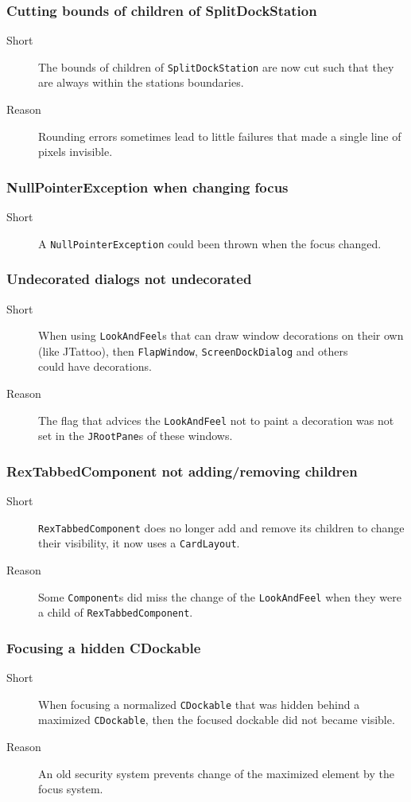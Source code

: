 \documentclass[a4paper,10pt]{article}
\newcommand{\src}[1]{\lstinline[basicstyle=\normalsize\ttfamily,keywordstyle=\normalsize\ttfamily,identifierstyle=\normalsize\ttfamily]|#1|}
\newcommand{\short}{\item[Short]}
\newcommand{\why}{\item[Reason]}
\begin{document}
\subsubsection{Cutting bounds of children of SplitDockStation}
\begin{description}
 \short The bounds of children of \src{SplitDockStation} are now cut such that they are always within the stations boundaries.
 \why Rounding errors sometimes lead to little failures that made a single line of pixels invisible.
\end{description}

\subsubsection{NullPointerException when changing focus}
\begin{description}
 \short A \src{NullPointerException} could been thrown when the focus changed.
\end{description}

\subsubsection{Undecorated dialogs not undecorated}
\begin{description}
 \short When using \src{LookAndFeel}s that can draw window decorations on their own (like JTattoo), then \src{FlapWindow}, \src{ScreenDockDialog} and others\\could have decorations.
 \why The flag that advices the \src{LookAndFeel} not to paint a decoration was not set in the \src{JRootPane}s of these windows.
\end{description}

\subsubsection{RexTabbedComponent not adding/removing children}
\begin{description}
 \short \src{RexTabbedComponent} does no longer add and remove its children to change their visibility, it now uses a \src{CardLayout}.
 \why Some \src{Component}s did miss the change of the \src{LookAndFeel} when they were a child of \src{RexTabbedComponent}.
\end{description}

\subsubsection{Focusing a hidden CDockable}
\begin{description}
 \short When focusing a normalized \src{CDockable} that was hidden behind a maximized \src{CDockable}, then the focused dockable did not became visible.
 \why An old security system prevents change of the maximized element by the focus system.
\end{description}
\end{document}
